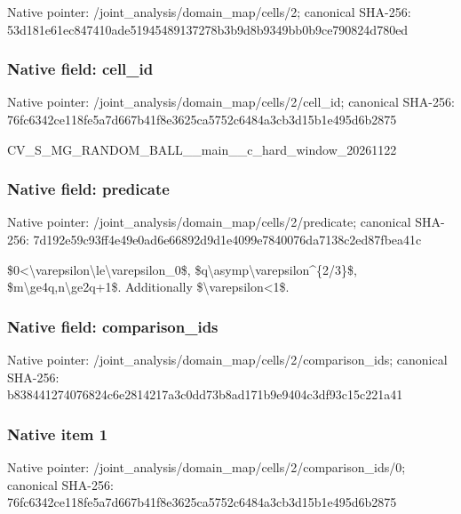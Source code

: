 \documentclass[10pt,a4paper]{article}
\begin{document}
Native pointer: /joint\_analysis/domain\_map/cells/2; canonical SHA-256: 53d181e61ec847410ade5194\allowbreak{}5489137278b3b9d8b9349bb0\allowbreak{}b9ce790824d780ed



\subsubsection{Native field: cell\_id}


Native pointer: /joint\_analysis/domain\_m\allowbreak{}ap/cells/2/cell\_id; canonical SHA-256: 76fc6342ce118fe5a7d667b4\allowbreak{}1f8e3625ca5752c6484a3cb3\allowbreak{}d15b1e495d6b2875


CV\_S\_MG\_RANDOM\_BALL\_\_mai\allowbreak{}n\_\_c\_hard\_window\_2026112\allowbreak{}2


\subsubsection{Native field: predicate}


Native pointer: /joint\_analysis/domain\_m\allowbreak{}ap/cells/2/predicate; canonical SHA-256: 7d192e59c93ff4e49e0ad6e6\allowbreak{}6892d9d1e4099e7840076da7\allowbreak{}138c2ed87fbea41c


\$0<\textbackslash{}varepsilon\textbackslash{}le\textbackslash{}varepsilon\_0\$, \$q\textbackslash{}asymp\textbackslash{}varepsilon\textasciicircum{}\{2/3\}\$, \$m\textbackslash{}ge4q,n\textbackslash{}ge2q+1\$. Additionally \$\textbackslash{}varepsilon<1\$.


\subsubsection{Native field: comparison\_ids}


Native pointer: /joint\_analysis/domain\_m\allowbreak{}ap/cells/2/comparison\_id\allowbreak{}s; canonical SHA-256: b838441274076824c6e28142\allowbreak{}17a3c0dd73b8ad171b9e9404\allowbreak{}c3df93c15c221a41



\subsubsection{Native item 1}


Native pointer: /joint\_analysis/domain\_m\allowbreak{}ap/cells/2/comparison\_id\allowbreak{}s/0; canonical SHA-256: 76fc6342ce118fe5a7d667b4\allowbreak{}1f8e3625ca5752c6484a3cb3\allowbreak{}d15b1e495d6b2875
\end{document}
